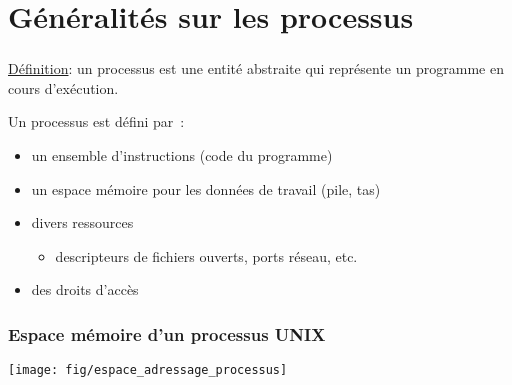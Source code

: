 \section{Généralités sur les processus}
\begin{frame}
\frametitle{\insertsection}
\vspace{0.5cm}
\underline{Définition}:
un processus est une entité abstraite qui représente
un \alert{programme en cours d'exécution}.\\
\vspace{0.6cm}

Un processus est défini par~:
\begin{itemize}
\item un \alert{ensemble d'instructions} (code du programme) 
\item un \alert{espace mémoire} pour les données de travail (pile, tas)
\item divers ressources
  \begin{itemize}
  \item descripteurs de fichiers ouverts, ports réseau, etc.
  \end{itemize}
\item des \alert{droits d'accès}
\end{itemize}
\vspace{0.5cm}
\end{frame}

\begin{frame}
  \frametitle{Espace mémoire d'un processus UNIX}
  \begin{minipage}[t]{\linewidth}
    \center
    \texttt{[image: fig/espace\_adressage\_processus]}
  \end{minipage}
\end{frame}



